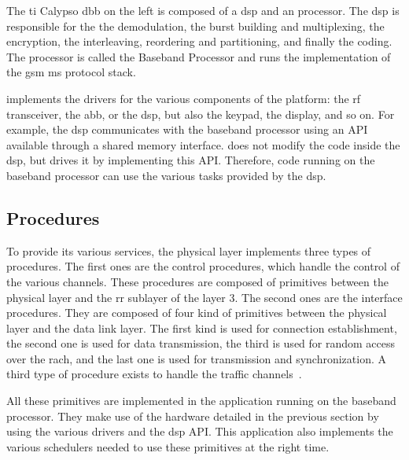     The \gls{ti} Calypso \gls{dbb} on the left is composed of a
    \gls{dsp} and an  processor. The \gls{dsp} is
    responsible for the the demodulation, the burst building and
    multiplexing, the encryption, the interleaving, reordering and
    partitioning, and finally the coding. The  processor is
    called the Baseband Processor and runs the 
    implementation of the \gls{gsm} \gls{ms} protocol stack.

     implements the drivers for the various components
    of the platform: the \gls{rf} transceiver, the \gls{abb}, or the
    \gls{dsp}, but also the keypad, the display, and so on. For example,
    the \gls{dsp} communicates with the baseband processor using an API
    available through a shared memory interface.  does
    not modify the code inside the \gls{dsp}, but drives it by
    implementing this API. Therefore, code running on the baseband
    processor can use the various tasks provided by the \gls{dsp}.

  \subsection{Procedures}

    To provide its various services, the physical layer implements three
    types of procedures. The first ones are the control procedures,
    which handle the control of the various channels. These procedures
    are composed of primitives between the physical layer and the
    \gls{rr} sublayer of the layer 3. The second ones are the interface
    procedures. They are composed of four kind of primitives between the
    physical layer and the data link layer. The first kind is used for
    connection establishment, the second one is used for data
    transmission, the third is used for random access over the
    \gls{rach}, and the last one is used for transmission and
    synchronization. A third type of procedure exists to handle the
    traffic channels~\cite{3gpp_ts_2014-4,3gpp_ts_2014-5,osmocombb_ms-side_????}.

    All these primitives are implemented in the 
     application running on the baseband processor. They
    make use of the hardware detailed in the previous section by using
    the various drivers and the \gls{dsp} API. This application also
    implements the various schedulers needed to use these primitives at
    the right time.

